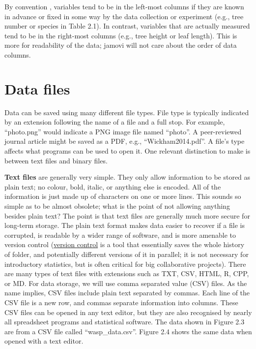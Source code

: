 \documentclass[
]{scrbook}
\begin{document}
By convention \citep{Wickham2014}, variables tend to be in the left-most columns if they are known in advance or fixed in some way by the data collection or experiment (e.g., tree number or species in Table 2.1).
In contrast, variables that are actually measured tend to be in the right-most columns (e.g., tree height or leaf length).
This is more for readability of the data; jamovi will not care about the order of data columns.

\hypertarget{data-files}{%
\section{Data files}\label{data-files}}

Data can be saved using many different file types.
File type is typically indicated by an extension following the name of a file and a full stop.
For example, ``photo.png'' would indicate a PNG image file named ``photo''.
A peer-reviewed journal article might be saved as a PDF, e.g., ``Wickham2014.pdf''.
A file's type affects what programs can be used to open it.
One relevant distinction to make is between text files and binary files.

\textbf{Text files} are generally very simple.
They only allow information to be stored as plain text; no colour, bold, italic, or anything else is encoded.
All of the information is just made up of characters on one or more lines.
This sounds so simple as to be almost obsolete; what is the point of not allowing anything besides plain text?
The point is that text files are generally much more secure for long-term storage.
The plain text format makes data easier to recover if a file is corrupted, is readable by a wider range of software, and is more amenable to version control (\href{https://bradduthie.github.io/version_control/vc_notes.html}{version control} is a tool that essentially saves the whole history of folder, and potentially different versions of it in parallel; it is not necessary for introductory statistics, but is often critical for big collaborative projects).
There are many types of text files with extensions such as TXT, CSV, HTML, R, CPP, or MD.
For data storage, we will use comma separated value (CSV) files.
As the name implies, CSV files include plain text separated by commas.
Each line of the CSV file is a new row, and commas separate information into columns.
These CSV files can be opened in any text editor, but they are also recognised by nearly all spreadsheet programs and statistical software.
The data shown in Figure 2.3 are from a CSV file called ``wasp\_data.csv''.
Figure 2.4 shows the same data when opened with a text editor.
\end{document}
